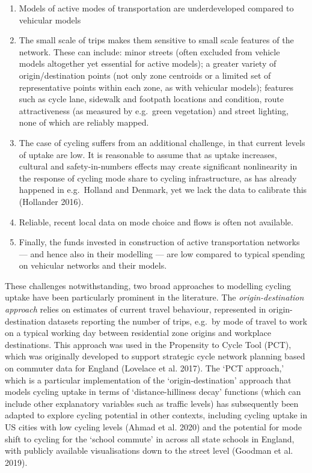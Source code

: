\documentclass[galley]{jtlu-article-2col}
\providecommand{\tightlist}{%
  \setlength{\itemsep}{0pt}\setlength{\parskip}{0pt}}
\begin{document}
\begin{enumerate}
\def\labelenumi{\arabic{enumi}.}
\tightlist
\item
  Models of active modes of transportation are underdeveloped compared to vehicular models
\item
  The small scale of trips makes them sensitive to small scale features of the network. These can include: minor streets (often excluded from vehicle models altogether yet essential for active models); a greater variety of origin/destination points (not only zone centroids or a limited set of representative points within each zone, as with vehicular models); features such as cycle lane, sidewalk and footpath locations and condition, route attractiveness (as measured by e.g.~green vegetation) and street lighting, none of which are reliably mapped.
\item
  The case of cycling suffers from an additional challenge, in that current levels of uptake are low. It is reasonable to assume that as uptake increases, cultural and safety-in-numbers effects may create significant nonlinearity in the response of cycling mode share to cycling infrastructure, as has already happened in e.g.~Holland and Denmark, yet we lack the data to calibrate this (Hollander 2016).
\item
  Reliable, recent local data on mode choice and flows is often not available.
\item
  Finally, the funds invested in construction of active transportation networks --- and hence also in their modelling --- are low compared to typical spending on vehicular networks and their models.
\end{enumerate}

These challenges notwithstanding, two broad approaches to modelling cycling uptake have been particularly prominent in the literature.
The \emph{origin-destination approach} relies on estimates of current travel behaviour, represented in origin-destination datasets reporting the number of trips, e.g.~by mode of travel to work on a typical working day between residential zone origins and workplace destinations. This approach was used in the Propensity to Cycle Tool (PCT), which was originally developed to support strategic cycle network planning based on commuter data for England (Lovelace et al. 2017). The `PCT approach,' which is a particular implementation of the `origin-destination' approach that models cycling uptake in terms of `distance-hilliness decay' functions (which can include other explanatory variables such as traffic levels) has subsequently been adapted to explore cycling potential in other contexts, including cycling uptake in US cities with low cycling levels (Ahmad et al. 2020) and the potential for mode shift to cycling for the `school commute' in across all state schools in England, with publicly available visualisations down to the street level (Goodman et al. 2019).
\end{document}
